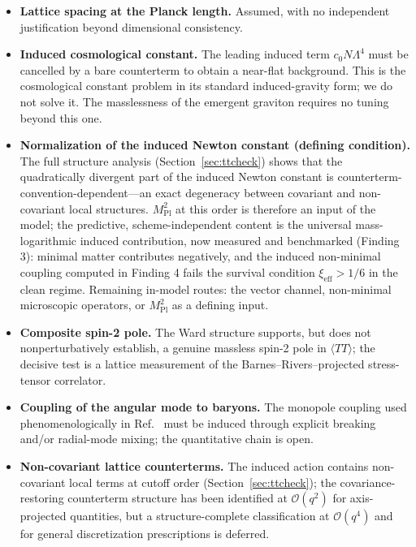 \documentclass[11pt,a4paper]{article}
\begin{document}
\begin{itemize}
\item \textbf{Lattice spacing at the Planck length.}
  Assumed, with no independent justification beyond dimensional
  consistency.
\item \textbf{Induced cosmological constant.}
  The leading induced term $c_0 N \Lambda^4$ must be cancelled by a
  bare counterterm to obtain a near-flat background.
  This is the cosmological constant problem in its standard
  induced-gravity form; we do not solve it.
  The masslessness of the emergent graviton requires no tuning
  beyond this one.
\item \textbf{Normalization of the induced Newton constant
  (defining condition).}
  The full structure analysis (Section~\ref{sec:ttcheck}) shows
  that the quadratically divergent part of the induced Newton
  constant is counterterm-convention-dependent---an exact
  degeneracy between covariant and non-covariant local structures.
  $M_{\mathrm{Pl}}^2$ at this order is therefore an input of the
  model; the predictive, scheme-independent content is the
  universal mass-logarithmic induced contribution, now measured and
  benchmarked (Finding 3): minimal matter contributes negatively,
  and the induced non-minimal coupling computed in Finding 4 fails
  the survival condition $\xi_{\mathrm{eff}} > 1/6$ in the clean
  regime.
  Remaining in-model routes: the vector channel, non-minimal
  microscopic operators, or $M_{\mathrm{Pl}}^2$ as a defining
  input.
\item \textbf{Composite spin-2 pole.}
  The Ward structure supports, but does not nonperturbatively
  establish, a genuine massless spin-2 pole in
  $\langle TT\rangle$; the decisive test is a lattice measurement
  of the Barnes--Rivers--projected stress-tensor correlator.
\item \textbf{Coupling of the angular mode to baryons.}
  The monopole coupling used phenomenologically in
  Ref.~\cite{Cheng:2025sparc} must be induced through explicit
  breaking and/or radial-mode mixing; the quantitative chain is
  open.
\item \textbf{Non-covariant lattice counterterms.}
  The induced action contains non-covariant local terms at cutoff
  order (Section~\ref{sec:ttcheck}); the covariance-restoring
  counterterm structure has been identified at $\mathcal{O}(q^2)$
  for axis-projected quantities, but a structure-complete
  classification at $\mathcal{O}(q^4)$ and for general
  discretization prescriptions is deferred.
\end{itemize}
\end{document}
